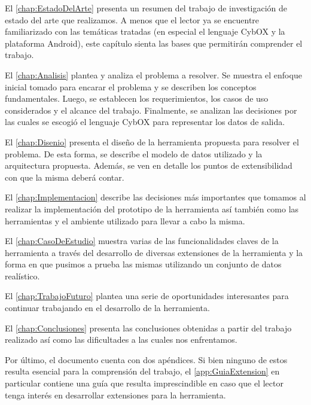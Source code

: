 El \autoref{chap:EstadoDelArte} presenta un resumen del trabajo de investigación de estado del arte que realizamos. A menos que el lector ya se encuentre familiarizado con las temáticas tratadas (en especial el lenguaje CybOX y la plataforma Android), este capítulo sienta las bases que permitirán comprender el trabajo.

El \autoref{chap:Analisis} plantea y analiza el problema a resolver. Se muestra el enfoque inicial tomado para encarar el problema y se describen los conceptos fundamentales. Luego, se establecen los requerimientos, los casos de uso considerados y el alcance del trabajo. Finalmente, se analizan las decisiones por las cuales se escogió el lenguaje CybOX para representar los datos de salida.

El \autoref{chap:Disenio} presenta el diseño de la herramienta propuesta para resolver el problema. De esta forma, se describe el modelo de datos utilizado y la arquitectura propuesta. Además, se ven en detalle los puntos de extensibilidad con que la misma deberá contar.

El \autoref{chap:Implementacion} describe las decisiones más importantes que tomamos al realizar la implementación del prototipo de la herramienta así también como las herramientas y el ambiente utilizado para llevar a cabo la misma.

El \autoref{chap:CasoDeEstudio} muestra varias de las funcionalidades claves de la herramienta a través del desarrollo de diversas extensiones de la herramienta y la forma en que pusimos a prueba las mismas utilizando un conjunto de datos realístico.

El \autoref{chap:TrabajoFuturo} plantea una serie de oportunidades interesantes para continuar trabajando en el desarrollo de la herramienta.

El \autoref{chap:Conclusiones} presenta las conclusiones obtenidas a partir del trabajo realizado así como las dificultades a las cuales nos enfrentamos.

Por último, el documento cuenta con dos apéndices. Si bien ninguno de estos resulta esencial para la comprensión del trabajo, el \autoref{app:GuiaExtension} en particular contiene una guía que resulta imprescindible en caso que el lector tenga interés en desarrollar extensiones para la herramienta.
